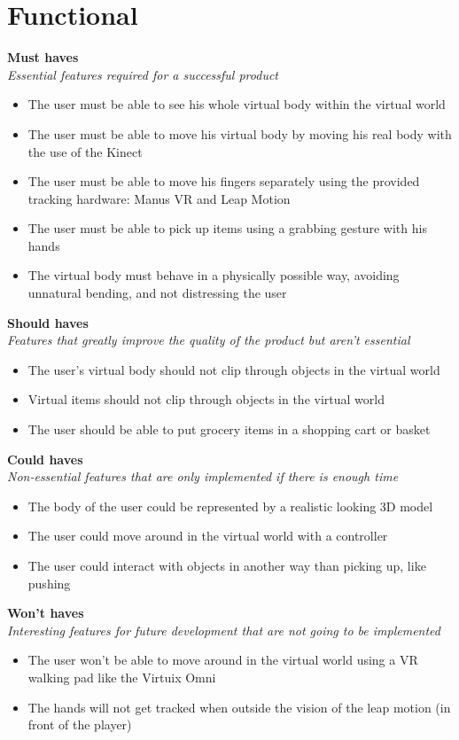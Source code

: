 \documentclass[11pt,a4paper]{report}
\begin{document}
\section{Functional}
\textbf{Must haves} \\
\textit{Essential features required for a successful product}
\begin{itemize}
\item The user must be able to see his whole virtual body within the virtual world
\item The user must be able to move his virtual body by moving his real body with the use of the Kinect
\item  The user must be able to move his fingers separately using the provided tracking hardware:
Manus VR and Leap Motion
\item The user must be able to pick up items using a grabbing gesture with his hands
\item The virtual body must behave in a physically possible way, avoiding unnatural bending, and not
distressing the user
\end{itemize}
\textbf{Should haves} \\
\textit{Features that greatly improve the quality of the product but aren't essential}
\begin{itemize}
\item The user’s virtual body should not clip through objects in the virtual world
\item Virtual items should not clip through objects in the virtual world
\item The user should be able to put grocery items in a shopping cart or basket
\end{itemize} 
\textbf{Could haves} \\
\textit{Non-essential features that are only implemented if there is enough time}
\begin{itemize}
\item The body of the user could be represented by a realistic looking 3D model
\item The user could move around in the virtual world with a controller
\item The user could interact with objects in another way than picking up, like pushing
\end{itemize}
\textbf{Won't haves} \\
\textit{Interesting features for future development that are not going to be implemented}
\begin{itemize}
\item The user won’t be able to move around in the virtual world using a VR walking pad like the Virtuix Omni
\item The hands will not get tracked when outside the vision of the leap motion (in front of the player)
\end{itemize}
\newpage
\end{document}
